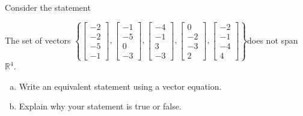 
\begin{exerciseStatement}


Consider the statement 
\begin{center}\begin{minipage}{0.8\textwidth}
 The set of vectors \( \left\{ \left[\begin{array}{c}
-2 \\
-2 \\
-5 \\
-1
\end{array}\right] , \left[\begin{array}{c}
-1 \\
-5 \\
0 \\
-3
\end{array}\right] , \left[\begin{array}{c}
-4 \\
-1 \\
3 \\
-3
\end{array}\right] , \left[\begin{array}{c}
0 \\
-2 \\
-3 \\
2
\end{array}\right] , \left[\begin{array}{c}
-2 \\
-1 \\
-4 \\
4
\end{array}\right] \right\} \)does not span \(\mathbb{R}^4\). 
\end{minipage}\end{center}
    


\begin{enumerate}[(a)]
\item  Write an equivalent statement using a vector equation.
\item  Explain why your statement is true or false.
\end{enumerate}
    
\end{exerciseStatement}
    
